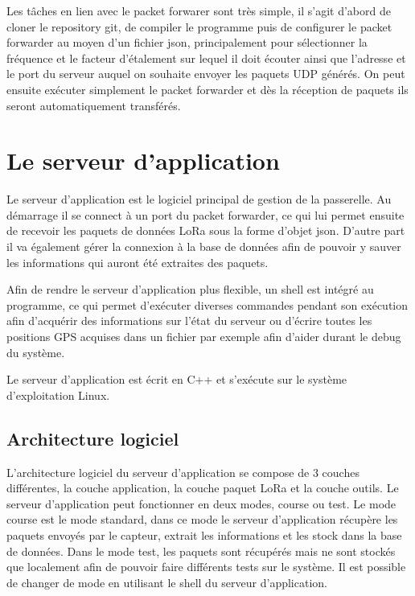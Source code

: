 Les tâches en lien avec le packet forwarer sont très simple, il s'agit d'abord de cloner le repository git, de compiler le programme puis de configurer le packet forwarder au moyen d'un fichier json, principalement pour sélectionner la fréquence et le facteur d'étalement sur lequel il doit écouter ainsi que l'adresse et le port du serveur auquel on souhaite envoyer les paquets UDP générés. On peut ensuite exécuter simplement le packet forwarder et dès la réception de paquets ils seront automatiquement transférés.

\section{Le serveur d'application}

Le serveur d'application est le logiciel principal de gestion de la passerelle. Au démarrage il se connect à un port du packet forwarder, ce qui lui permet ensuite de recevoir les paquets de données LoRa sous la forme d'objet json. D'autre part il va également gérer la connexion à la base de données afin de pouvoir y sauver les informations qui auront été extraites des paquets.

Afin de rendre le serveur d'application plus flexible, un shell est intégré au programme, ce qui permet d'exécuter diverses commandes pendant son exécution afin d'acquérir des informations sur l'état du serveur ou d'écrire toutes les positions GPS acquises dans un fichier par exemple afin d'aider durant le debug du système.

Le serveur d'application est écrit en C++ et s'exécute sur le système d'exploitation Linux.

\subsection{Architecture logiciel}

L'architecture logiciel du serveur d'application se compose de 3 couches différentes, la couche application, la couche paquet LoRa et la couche outils. Le serveur d'application peut fonctionner en deux modes, course ou test. Le mode course est le mode standard, dans ce mode le serveur d'application récupère les paquets envoyés par le capteur, extrait les informations et les stock dans la base de données. Dans le mode test, les paquets sont récupérés mais ne sont stockés que localement afin de pouvoir faire différents tests sur le système. Il est possible de changer de mode en utilisant le shell du serveur d'application.


